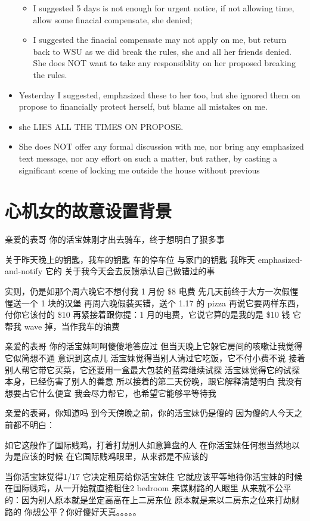 \documentclass[9pt, b5paper]{article}
\begin{document}
\begin{itemize}
\begin{itemize}
\item I suggested 5 days is not enough for urgent notice, if not allowing time, allow some finacial compensate, she denied;
\item I suggested the finacial compensate may not apply on me, but return back to WSU as we did break the rules, she and all her friends denied. She does NOT want to take any responsiblity on her proposed breaking the rules.
\end{itemize}
\item Yesterday I suggested, emphasized these to her too, but she ignored them on propose to financially protect herself, but blame all mistakes on me.
\item she LIES ALL THE TIMES ON PROPOSE.
\item She does NOT offer any formal discussion with me, nor bring any emphasized text message, nor any effort on such a matter, but rather, by casting a significant scene of locking me outside the house without previous
\end{itemize}

\section{心机女的故意设置背景}
\label{sec-9}
亲爱的表哥
你的活宝妹刚才出去骑车，终于想明白了狠多事

关于昨天晚上的钥匙，我车的钥匙
车的停车位
与家门的钥匙
我昨天 emphasized-and-notify 它的
关于我今天会去反馈承认自己做错过的事

实则，仍是如那个周六晚它不想付我 1 月份 \$8 电费
先几天前终于大方一次假惺惺送一个 1 块的汉堡
再周六晚假装买错，送个 1.17 的 pizza
再说它要两样东西，付你它该付的 \$10
再紧接着跟你提：1 月的电费，它说它算的是我的是 \$10 钱
它帮我 wave 掉，当作我车的油费

亲爱的表哥
你的活宝妹呵呵傻傻地答应过
但当天晚上它躲它房间的咳嗽让我觉得它似简想不通
意识到这点儿
活宝妹觉得当别人请过它吃饭，它不付小费不说
接着别人帮它带它买菜，它还要用一盒最大包装的蓝霉继续试探
活宝妹觉得它的试探本身，已经伤害了别人的善意
所以接着的第二天傍晚，跟它解释清楚明白
我没有想要占它什么便宜
我会尽力帮它，也希望它能够平等待我

亲爱的表哥，你知道吗
到今天傍晚之前，你的活宝妹仍是傻的
因为傻的人今天之前都不明白：

如它这般作了国际贱鸡，打着打劫别人如意算盘的人
在你活宝妹任何想当然地以为是应该的时候
在它国际贱鸡眼里，从来都是不应该的

当你活宝妹觉得1/17 它决定租房给你活宝妹住
它就应该平等地待你活宝妹的时候
在国际贱鸡，从一开始就直接租住2 bedroom 来谋财路的人眼里
从来就不公平的：因为别人原本就是坐定高高在上二房东位
原本就是来以二房东之位来打劫财路的
你想公平？你好傻好天真。。。。。
\end{document}
